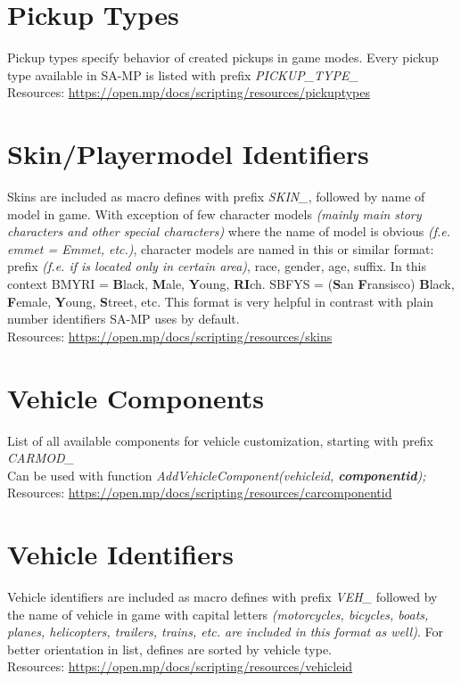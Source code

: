 \documentclass{article}
\begin{document}
\section{Pickup Types}
Pickup types specify behavior of created pickups in game modes. Every pickup type available in SA-MP is listed with prefix \textit{PICKUP\_TYPE\_}
\bigskip
\\Resources: \url{https://open.mp/docs/scripting/resources/pickuptypes}


\section{Skin/Playermodel Identifiers}
Skins are included as macro defines with prefix \textit{SKIN\_}, followed by name of model in game. With exception of few character models \textit{(mainly main story characters and other special characters)} where the name of model is obvious \textit{(f.e. emmet = Emmet, etc.)}, character models are named in this or similar format: prefix \textit{(f.e. if is located only in certain area)}, race, gender, age, suffix. In this context BMYRI = \textbf{B}lack, \textbf{M}ale, \textbf{Y}oung, \textbf{RI}ch. SBFYS = (\textbf{S}an \textbf{F}ransisco) \textbf{B}lack, \textbf{F}emale, \textbf{Y}oung, \textbf{S}treet, etc. This format is very helpful in contrast with plain number identifiers SA-MP uses by default.
\bigskip
\\Resources: \url{https://open.mp/docs/scripting/resources/skins}


\section{Vehicle Components}
List of all available components for vehicle customization, starting with prefix \textit{CARMOD\_}\\Can be used with function \textit{AddVehicleComponent(vehicleid, \textbf{componentid});}
\bigskip
\\Resources: \url{https://open.mp/docs/scripting/resources/carcomponentid}


\section{Vehicle Identifiers}
Vehicle identifiers are included as macro defines with prefix \textit{VEH\_} followed by the name of vehicle in game with capital letters \textit{(motorcycles, bicycles, boats, planes, helicopters, trailers, trains, etc. are included in this format as well)}. For better orientation in list, defines are sorted by vehicle type.
\bigskip
\\Resources: \url{https://open.mp/docs/scripting/resources/vehicleid}
\end{document}
